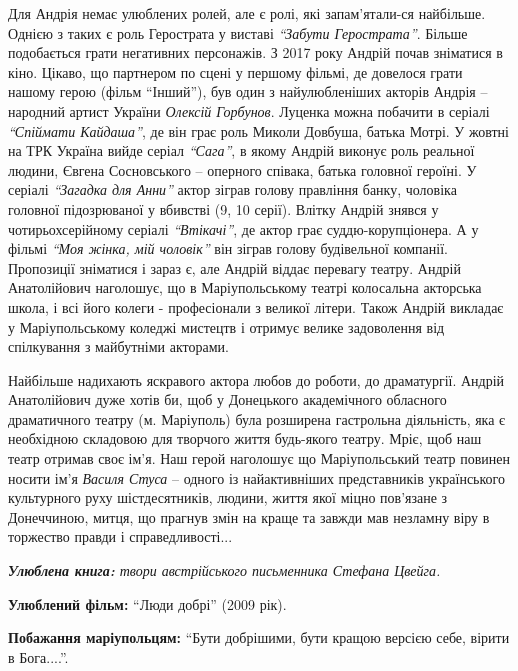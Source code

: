 Для Андрія немає улюблених ролей, але є ролі, які запам'ятали\hyp{}ся найбільше.
Однією з таких є роль Герострата у виставі \emph{\enquote{Забути Герострата}}. Більше
подобається грати негативних персонажів. З 2017 року Андрій почав зніматися в
кіно. Цікаво, що партнером по сцені у першому фільмі, де довелося грати нашому
герою (фільм \enquote{Інший}), був один з найулюбленіших акторів Андрія – народний
артист України \emph{Олексій Горбунов}. Луценка можна побачити в серіалі \emph{\enquote{Спіймати
Кайдаша}}, де він грає роль Миколи Довбуша, батька Мотрі. У жовтні на ТРК
Україна вийде серіал \emph{\enquote{Сага}}, в якому Андрій виконує роль реальної людини,
Євгена Сосновського – оперного співака, батька головної героїні. У серіалі
\emph{\enquote{Загадка для Анни}} актор зіграв голову правління банку, чоловіка головної
підозрюваної у вбивстві (9, 10 серії). Влітку Андрій знявся у чотирьохсерійному
серіалі \emph{\enquote{Втікачі}}, де актор грає суддю-корупціонера. А у фільмі \emph{\enquote{Моя жінка, мій
чоловік}} він зіграв голову будівельної компанії. Пропозиції зніматися і зараз
є, але Андрій віддає перевагу театру. Андрій Анатолійович наголошує, що в
Маріупольському театрі колосальна акторська школа, і всі його колеги -
професіонали з великої літери. Також Андрій викладає у Маріупольському коледжі
мистецтв і отримує велике задоволення від спілкування з майбутніми акторами.

Найбільше надихають яскравого актора любов до роботи, до драматургії. Андрій
Анатолійович дуже хотів би, щоб у Донецького академічного обласного
драматичного театру (м. Маріуполь) була розширена гастрольна діяльність, яка є
необхідною складовою для творчого життя будь-якого театру. Мріє, щоб наш театр
отримав своє ім'я. Наш герой наголошує що Маріупольський театр повинен носити
ім'я \emph{Василя Стуса} – одного із найактивніших представників українського
культурного руху шістдесятників, людини, життя якої міцно пов'язане з
Донеччиною, митця, що прагнув змін на краще та завжди мав незламну віру в
торжество правди і справедливості...

\begingroup
\em
\textbf{Улюблена книга:} твори австрійського письменника Стефана Цвейга.

\textbf{Улюблений фільм:} \enquote{Люди добрі} (2009 рік).

\textbf{Побажання маріупольцям:} \enquote{Бути добрішими, бути кращою версією себе, вірити в Бога....}.
\endgroup
